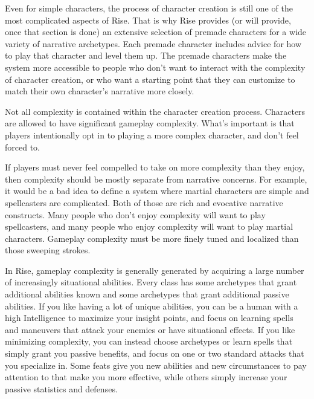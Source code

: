        Even for simple characters, the process of character creation is still one of the most complicated aspects of Rise.
        That is why Rise provides (or will provide, once that section is done) an extensive selection of premade characters for a wide variety of narrative archetypes.
        Each premade character includes advice for how to play that character and level them up.
        The premade characters make the system more accessible to people who don't want to interact with the complexity of character creation, or who want a starting point that they can customize to match their own character's narrative more closely.

        Not all complexity is contained within the character creation process.
        Characters are allowed to have significant gameplay complexity.
        What's important is that players intentionally opt in to playing a more complex character, and don't feel forced to.

        If players must never feel compelled to take on more complexity than they enjoy, then complexity should be mostly separate from narrative concerns.
        For example, it would be a bad idea to define a system where martial characters are simple and spellcasters are complicated.
        Both of those are rich and evocative narrative constructs.
        Many people who don't enjoy complexity will want to play spellcasters, and many people who enjoy complexity will want to play martial characters.
        Gameplay complexity must be more finely tuned and localized than those sweeping strokes.

        In Rise, gameplay complexity is generally generated by acquiring a large number of increasingly situational abilities.
        Every class has some archetypes that grant additional abilities known and some archetypes that grant additional passive abilities.
        If you like having a lot of unique abilities, you can be a human with a high Intelligence to maximize your insight points, and focus on learning spells and maneuvers that attack your enemies or have situational effects.
        If you like minimizing complexity, you can instead choose archetypes or learn spells that simply grant you passive benefits, and focus on one or two standard attacks that you specialize in.
        Some feats give you new abilities and new circumstances to pay attention to that make you more effective, while others simply increase your passive statistics and defenses.

